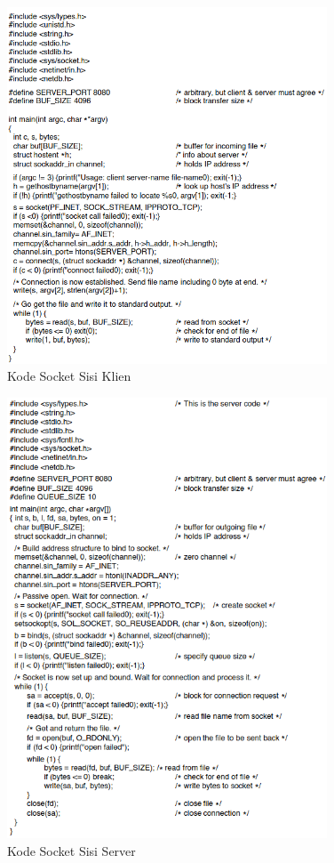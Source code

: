 \begin{figure}[H]
  \centering{}
	\includegraphics[width=0.85\textwidth]{gambar/socket_client_code}
  \caption{Kode Socket Sisi Klien}
\end{figure}

\begin{figure}[H]
  \centering{}
	\includegraphics[width=0.85\textwidth]{gambar/socket_server_code}
  \caption{Kode Socket Sisi Server}
\end{figure}


